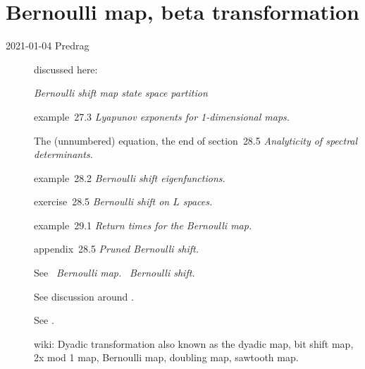 
\section{Bernoulli map, beta transformation}
\label{sect:Bernoulli}


\begin{description}

\item[2021-01-04 Predrag] discussed here:

{\em Bernoulli shift map state space partition}

{example~{27.3}} {\em Lyapunov exponents for 1-dimensional maps.}

The (unnumbered) equation, the end of 
{section~{28.5}} {\em Analyticity of spectral determinants.}

{example~{28.2}} {\em Bernoulli shift eigenfunctions.}

{exercise~{28.5}} {\em Bernoulli shift on $L$ spaces.}

{example~{29.1}} {\em Return times for the Bernoulli map.}

{appendix~{28.5}} {\em Pruned Bernoulli shift.}

See
~{\em Bernoulli map.}
~{\em Bernoulli shift.}

See discussion around .

See .

{wiki: Dyadic transformation}
also known as the dyadic map, bit shift map,
2x mod 1 map, Bernoulli map, doubling map, sawtooth map.



\end{description}
